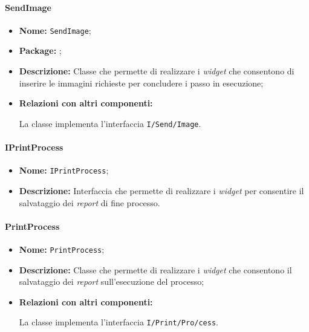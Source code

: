 \paragraph{SendImage}
\begin{flushleft}
\begin{itemize}
\item \textbf{Nome:} \texttt{SendImage};
\item \textbf{Package:} \texttt{\viewUser{}};
\item \textbf{Descrizione:} Classe che permette di realizzare i \textit{widget} che consentono di inserire le immagini richieste per concludere i passo in esecuzione;
\item \textbf{Relazioni con altri componenti:}
\begin{sloppypar}
La classe implementa l'interfaccia \texttt{I\fshyp{}Send\fshyp{}Image}.
\end{sloppypar}
\end{itemize}
\end{flushleft}

\paragraph{IPrintProcess}
\begin{itemize}
\item \textbf{Nome:} \texttt{IPrintProcess};
\item \textbf{Descrizione:} Interfaccia che permette di realizzare i \textit{widget} per consentire il salvataggio dei \textit{report} di fine processo.
\end{itemize}

\paragraph{PrintProcess}
\begin{flushleft}
\begin{itemize}
\item \textbf{Nome:} \texttt{PrintProcess};
\item \textbf{Descrizione:} Classe che permette di realizzare i \textit{widget} che consentono il salvataggio dei \textit{report} sull'esecuzione del processo;
\item \textbf{Relazioni con altri componenti:}
\begin{sloppypar}
La classe implementa l'interfaccia \texttt{I\fshyp{}Print\fshyp{}Pro\fshyp{}cess}.
\end{sloppypar}
\end{itemize}
\end{flushleft}